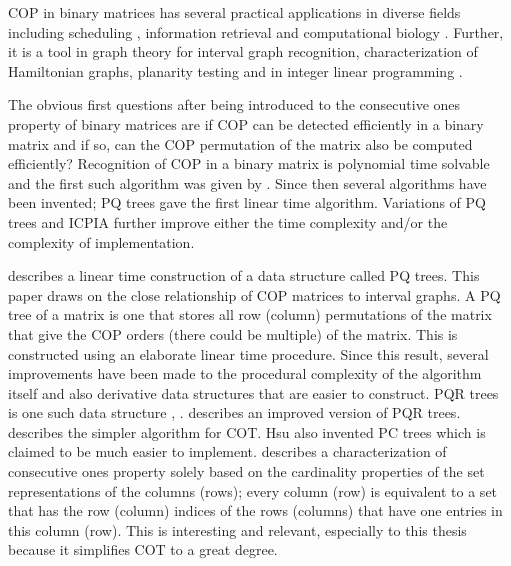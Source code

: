 \documentclass[MS,]{iitmdiss}
\begin{document}
COP in binary matrices has several practical applications in diverse
fields including scheduling \cite{hl06}, information retrieval
\cite{k77} and computational biology \cite{abh98}.  Further, it is a
tool in graph theory \cite{mcg04} for interval graph recognition,
characterization of Hamiltonian graphs, planarity testing \cite{bl76}
and in integer linear programming \cite{ht02,hl06}.


The obvious first questions after being introduced to the consecutive
ones property of binary matrices are if COP can be detected
efficiently in a binary matrix and if so, can the COP permutation of
the matrix also be computed efficiently?  Recognition of COP in a
binary matrix is polynomial time solvable and the first such algorithm
was given by \cite{fg65}.  Since then several algorithms have been
invented; PQ trees \cite{bl76} gave the first linear time
algorithm. Variations of PQ trees \cite{mm96,wlh01,wlh02,mcc04} and
ICPIA \cite{nsnrs09} further improve either the time complexity and/or
the complexity of implementation.

\cite{bl76} describes a linear time construction of a data structure
called PQ trees. This paper draws on the close relationship of COP
matrices to interval graphs. A PQ tree of a matrix is one that stores
all row (column) permutations of the matrix that give the COP orders
(there could be multiple) of the matrix. This is constructed using an
elaborate linear time procedure. Since this
result, several improvements have been made to the procedural
complexity of the algorithm itself and also derivative data structures
that are easier to construct. PQR trees is one such data structure
\cite{mm96}, \cite{mpt98}.  \cite{tm05} describes an improved version of PQR
trees. \cite{wlh02} describes
the simpler algorithm for COT.  Hsu also invented PC trees \cite{wlh01} which is
claimed to be much easier to implement. \cite{nsnrs09} describes a
characterization of consecutive ones property solely based on the
cardinality properties of the set representations of the columns
(rows); every column (row) is equivalent to a set that has the row
(column) indices of the rows (columns) that have one entries in this
column (row). This is interesting and relevant, especially to this
thesis because it simplifies COT to a great degree. 
\end{document}
